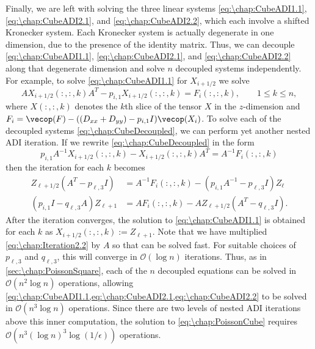 Finally, we are left with solving the three linear systems \cref{eq:\chap:CubeADI1.1}, \cref{eq:\chap:CubeADI2.1}, and \cref{eq:\chap:CubeADI2.2}, which each involve a shifted Kronecker system. Each Kronecker system is actually degenerate in one dimension, due to the presence of the identity matrix. Thus, we can decouple \cref{eq:\chap:CubeADI1.1}, \cref{eq:\chap:CubeADI2.1}, and \cref{eq:\chap:CubeADI2.2} along that degenerate dimension and solve $n$ decoupled systems independently. For example, to solve \cref{eq:\chap:CubeADI1.1} for $X_{i+1/2}$ we solve
\begin{equation}\label{eq:\chap:CubeDecoupled}
A X_{i+1/2}(:,:,k) A^T - p_{i,1} X_{i+1/2}(:,:,k) = F_i(:,:,k), \qquad 1\leq k\leq n,
\end{equation}
where $X(:,:,k)$ denotes the $k$th slice of the tensor $X$ in the $z$-dimension and $F_i = \vecop(F) - ((D_{xx} + D_{yy}) - p_{i,1}I) \vecop(X_i)$. To solve each of the decoupled systems \cref{eq:\chap:CubeDecoupled}, we can perform yet another nested ADI iteration. If we rewrite \cref{eq:\chap:CubeDecoupled} in the form
\[
p_{i,1} A^{-1} X_{i+1/2}(:,:,k) - X_{i+1/2}(:,:,k) A^T = A^{-1} F_i(:,:,k)
\]
then the iteration for each $k$ becomes
\begin{align}
Z_{\ell+1/2} (A^T - p_{\ell,3}I) &= A^{-1} F_i(:,:,k) - (p_{i,1}A^{-1} - p_{\ell,3}I) Z_\ell \label{eq:\chap:Iteration2.1} \\
(p_{i,1}I - q_{\ell,3}A) Z_{\ell+1} &= A F_i(:,:,k) - A Z_{\ell+1/2} (A^T - q_{\ell,3}I).\label{eq:\chap:Iteration2.2}
\end{align}
After the iteration converges, the solution to \cref{eq:\chap:CubeADI1.1} is obtained for each $k$ as \sloppy${X_{i+1/2}(:,:,k) := Z_{\ell+1}}$. Note that we have multiplied \cref{eq:\chap:Iteration2.2} by $A$ so that  can be solved fast. For suitable choices of $p_{\ell,3}$ and $q_{\ell,3}$, this will converge in $\mathcal{O}(\log n)$ iterations. Thus, as in \cref{sec:\chap:PoissonSquare}, each of the $n$ decoupled equations can be solved in $\mathcal{O}(n^2 \log n)$ operations, allowing \cref{eq:\chap:CubeADI1.1,eq:\chap:CubeADI2.1,eq:\chap:CubeADI2.2} to be solved in $\mathcal{O}(n^3 \log n)$ operations. Since there are two levels of nested ADI iterations above this inner computation, the solution to \cref{eq:\chap:PoissonCube} requires $\mathcal{O}(n^3 (\log n)^3 \log(1/\epsilon))$ operations.

